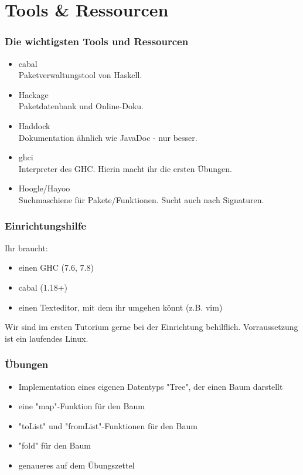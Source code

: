 \documentclass{beamer}
\begin{document}
\section{Tools \& Ressourcen}
\begin{frame}[fragile]
 \frametitle{Die wichtigsten Tools und Ressourcen}
 \pause
 \begin{itemize}
  \item cabal \\
	Paketverwaltungstool von Haskell.
  \pause
  \item Hackage \\
	Paketdatenbank und Online-Doku.
  \pause
  \item Haddock \\
	Dokumentation ähnlich wie JavaDoc - nur besser.
  \pause
  \item ghci \\
	Interpreter des GHC. Hierin macht ihr die ersten Übungen.
  \pause
  \item Hoogle/Hayoo \\
	Suchmaschiene für Pakete/Funktionen. Sucht auch nach Signaturen.
 \end{itemize}
\end{frame}

\begin{frame}[fragile]
 \frametitle{Einrichtungshilfe}
 Ihr braucht:\\
 \begin{itemize}
  \item einen GHC (7.6, 7.8)
  \item cabal (1.18+)
  \item einen Texteditor, mit dem ihr umgehen könnt (z.B. vim)
 \end{itemize}
 Wir sind im ersten Tutorium gerne bei der Einrichtung behilflich. Vorraussetzung ist ein laufendes Linux.
\end{frame}

\begin{frame}[fragile]
 \frametitle{Übungen}
 \begin{itemize}
  \item Implementation eines eigenen Datentyps "Tree", der einen Baum darstellt
  \pause
  \item eine "map"-Funktion für den Baum
  \pause
  \item "toList" und "fromList"-Funktionen für den Baum
  \pause
  \item "fold" für den Baum
  \pause
  \item genaueres auf dem Übungszettel
 \end{itemize}
\end{frame}

\end{document}
